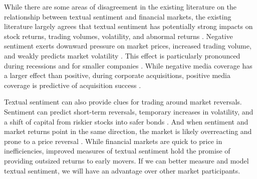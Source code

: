 \documentclass[11pt,a4paper,titlepage]{article}
\begin{document}


While there are some areas of disagreement in the existing literature on the relationship between textual sentiment and financial markets, the existing literature largely agrees that textual sentiment has potentially strong impacts on stock returns, trading volumes, volatility, and abnormal returns \citep{KearneyColm2014Tsif}. Negative sentiment exerts downward pressure on market prices, increased trading volume, and weakly predicts market volatility \citep{TetlockPaul2007GCtI}. This effect is particularly pronounced during recessions \citep{garciadiego2013SdR} and for smaller companies \citep{FergusonNickyJ2015MCaS}. While negative media coverage has a larger effect than positive, during corporate acquisitions, positive media coverage is predictive of acquisition success \citep{buehlmaier2015role}.

Textual sentiment can also provide clues for trading around market reversals. Sentiment can predict short-term reversals, temporary increases in volatility, and a shift of capital from riskier stocks into safer bonds \citep{DaZhi2015TSoA}. And when sentiment and market returns point in the same direction, the market is likely overreacting and prone to a price reversal \citep{froot2017media}. While financial markets are quick to price in inefficiencies, improved measures of textual sentiment hold the promise of providing outsized returns to early movers. If we can better measure and model textual sentiment, we will have an advantage over other market participants.











\end{document}
